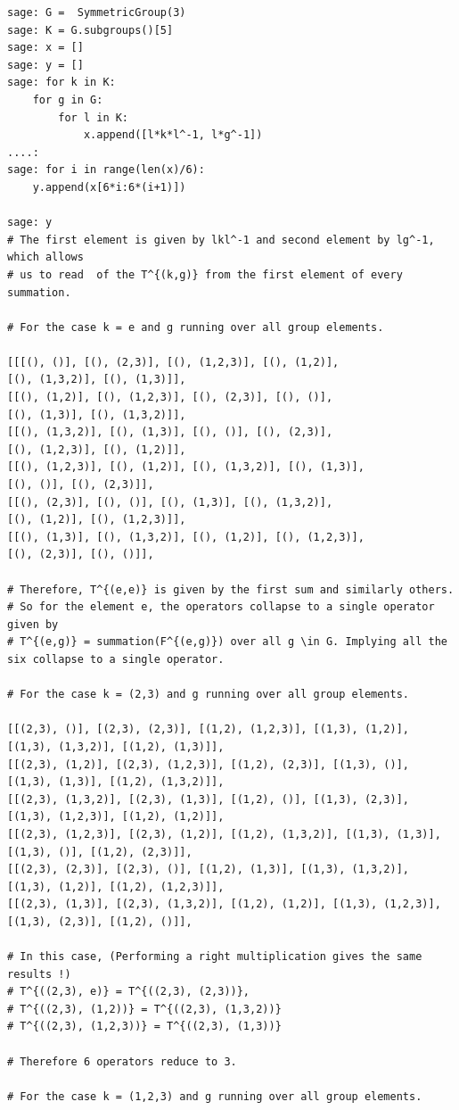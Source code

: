 \begin{lstlisting}[frame=single]
sage: G =  SymmetricGroup(3)
sage: K = G.subgroups()[5]
sage: x = []
sage: y = []
sage: for k in K:
    for g in G:
        for l in K:
            x.append([l*k*l^-1, l*g^-1])
....: 
sage: for i in range(len(x)/6):
    y.append(x[6*i:6*(i+1)])

sage: y
# The first element is given by lkl^-1 and second element by lg^-1, which allows
# us to read  of the T^{(k,g)} from the first element of every summation. 

# For the case k = e and g running over all group elements.

[[[(), ()], [(), (2,3)], [(), (1,2,3)], [(), (1,2)], 
[(), (1,3,2)], [(), (1,3)]],
[[(), (1,2)], [(), (1,2,3)], [(), (2,3)], [(), ()], 
[(), (1,3)], [(), (1,3,2)]],
[[(), (1,3,2)], [(), (1,3)], [(), ()], [(), (2,3)], 
[(), (1,2,3)], [(), (1,2)]],
[[(), (1,2,3)], [(), (1,2)], [(), (1,3,2)], [(), (1,3)], 
[(), ()], [(), (2,3)]],
[[(), (2,3)], [(), ()], [(), (1,3)], [(), (1,3,2)], 
[(), (1,2)], [(), (1,2,3)]],
[[(), (1,3)], [(), (1,3,2)], [(), (1,2)], [(), (1,2,3)], 
[(), (2,3)], [(), ()]],

# Therefore, T^{(e,e)} is given by the first sum and similarly others. 
# So for the element e, the operators collapse to a single operator given by 
# T^{(e,g)} = summation(F^{(e,g)}) over all g \in G. Implying all the six collapse to a single operator.

# For the case k = (2,3) and g running over all group elements.

[[(2,3), ()], [(2,3), (2,3)], [(1,2), (1,2,3)], [(1,3), (1,2)], 
[(1,3), (1,3,2)], [(1,2), (1,3)]],
[[(2,3), (1,2)], [(2,3), (1,2,3)], [(1,2), (2,3)], [(1,3), ()], 
[(1,3), (1,3)], [(1,2), (1,3,2)]],
[[(2,3), (1,3,2)], [(2,3), (1,3)], [(1,2), ()], [(1,3), (2,3)], 
[(1,3), (1,2,3)], [(1,2), (1,2)]],
[[(2,3), (1,2,3)], [(2,3), (1,2)], [(1,2), (1,3,2)], [(1,3), (1,3)], 
[(1,3), ()], [(1,2), (2,3)]],
[[(2,3), (2,3)], [(2,3), ()], [(1,2), (1,3)], [(1,3), (1,3,2)],
[(1,3), (1,2)], [(1,2), (1,2,3)]],
[[(2,3), (1,3)], [(2,3), (1,3,2)], [(1,2), (1,2)], [(1,3), (1,2,3)],
[(1,3), (2,3)], [(1,2), ()]],
  
# In this case, (Performing a right multiplication gives the same results !)
# T^{((2,3), e)} = T^{((2,3), (2,3))}, 
# T^{((2,3), (1,2))} = T^{((2,3), (1,3,2))} 
# T^{((2,3), (1,2,3))} = T^{((2,3), (1,3))} 

# Therefore 6 operators reduce to 3.

# For the case k = (1,2,3) and g running over all group elements.


\end{lstlisting}
